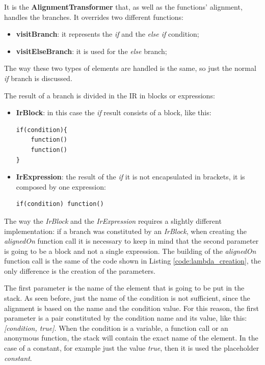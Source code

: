 It is the \textbf{AlignmentTransformer} that, as well as the functions' alignment, handles the branches. It overrides two different functions:
\begin{itemize}
    \item \textbf{visitBranch}: it represents the \textit{if} and the \textit{else if} condition;
    \item \textbf{visitElseBranch}: it is used for the \textit{else} branch;
\end{itemize}
The way these two types of elements are handled is the same, so just the normal \textit{if} branch is discussed.

The result of a branch is divided in the IR in blocks or expressions:
\begin{itemize}
    \item \textbf{IrBlock}: in this case the \textit{if} result consists of a block, like this:
\begin{lstlisting}
if(condition){
    function()
    function()
}
\end{lstlisting} 
    \item \textbf{IrExpression}: the result of the \textit{if} it is not encapsulated in brackets, it is composed by one expression:
\begin{lstlisting}
if(condition) function()
\end{lstlisting}
\end{itemize}

The way the \textit{IrBlock} and the \textit{IrExpression} requires a slightly different implementation: if a branch was constituted by an \textit{IrBlock}, when creating the \textit{alignedOn} function call it is necessary to keep in mind that the second parameter is going to be a block and not a single expression.\newline
The building of the \textit{alignedOn} function call is the same of the code shown in Listing \ref{code:lambda_creation}, the only difference is the creation of the parameters. 

The first parameter is the name of the element that is going to be put in the stack. As seen before, just the name of the condition is not sufficient, since the alignment is based on the name and the condition value. For this reason, the first parameter is a pair constituted by the condition name and its value, like this: \textit{[condition, true]}.\newline
When the condition is a variable, a function call or an anonymous function, the stack will contain the exact name of the element. In the case of a constant, for example just the value \textit{true}, then it is used the placeholder \textit{constant}.

